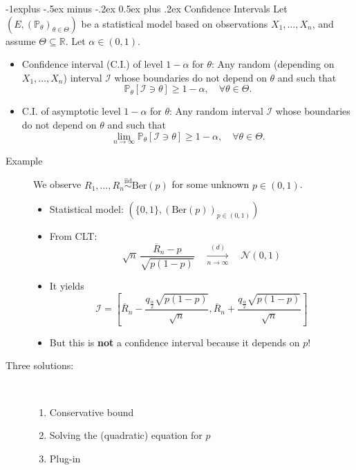 \documentclass[a4paper, 10pt,landscape]{article}
\makeatletter
\renewcommand{\subsection}{\@startsection{subsection}{2}{0mm}%
                                {-1explus -.5ex minus -.2ex}%
                                {0.5ex plus .2ex}%
                                {\normalfont\normalsize\bfseries}}
\makeatother
\begin{document}
\begin{multicols*}{3}
\subsection{Confidence Intervals}
Let $\left(E,\left(\mathbb{P}_\theta\right)_{\theta\in\Theta}\right)$ be a statistical model based on observations $X_1,\dots,X_n$, and assume $\Theta\subseteq\mathbb{R}$. Let $\alpha\in(0,1).$
\begin{itemize}
	\item Confidence interval (C.I.) of level $1-\alpha$ for $\theta$: Any random (depending on $X_1,\dots,X_n$) interval $\mathcal{I}$ whose boundaries do not depend on $\theta$ and such that $$\mathbb{P}_\theta\left[\mathcal{I}\ni\theta\right]\geq1-\alpha,\quad\forall\theta\in\Theta.$$
	\item C.I. of asymptotic level $1-\alpha$ for $\theta$: Any random interval $\mathcal{I}$ whose boundaries do not depend on $\theta$ and such that $$\lim\limits_{n\rightarrow\infty}\mathbb{P}_\theta\left[\mathcal{I}\ni\theta\right]\geq1-\alpha,\quad\forall\theta\in\Theta.$$
\end{itemize}

\begin{description}
	\item[Example] We observe $R_1,\dots,R_n\stackrel{\text{iid}}{\sim}\text{Ber}(p)$ for some unknown $p\in(0,1)$.
	\begin{itemize}
		\item Statistical model: $\left(\{0,1\},\left(\text{Ber}(p)\right)_{p\in(0,1)}\right)$
		\item From CLT:
		$$\sqrt{n}\,\dfrac{\overline{R}_n-p}{\sqrt{p(1-p)}}\quad\xrightarrow[n\rightarrow\infty]{(d)}\quad\mathcal{N}(0,1)$$
		\item It yields $$\mathcal{I}=\left[\overline{R}_n-\dfrac{q_{\frac{\alpha}{2}}\sqrt{p(1-p)}}{\sqrt{n}},\overline{R}_n+\dfrac{q_{\frac{\alpha}{2}}\sqrt{p(1-p)}}{\sqrt{n}}\right]$$
		\item But this is {\bf not} a confidence interval because it depends on $p$!
	\end{itemize}
	\item[Three solutions:] ~
	\begin{enumerate}
		\item Conservative bound
		\item Solving the (quadratic) equation for $p$
		\item Plug-in
	\end{enumerate}
\end{description}


\end{multicols*}
\end{document}
